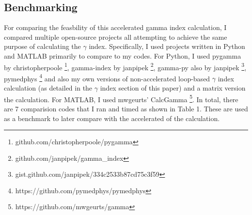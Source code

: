 \documentclass[12pt]{article}
\begin{document}
\subsection{Benchmarking}
For comparing the feasbility of this accelerated gamma index calculation, I compared multiple open-source projects all attempting to achieve the same purpose of calculating the $\gamma$ index. Specifically, I used projects written in Python and MATLAB primarily to compare to my codes. For Python, I used pygamma by christopherpoole \footnote[1]{github.com/christopherpoole/pygamma}, gamma-index by janpipek \footnote[2]{github.com/janpipek/gamma\_index}, gamma-py also by janpipek \footnote[3]{gist.github.com/janpipek/334c2533b87cd75c3f59}, pymedphys \footnote[5]{https://github.com/pymedphys/pymedphys} and also my own versions of non-accelerated loop-based $\gamma$ index calculation (as detailed in the $\gamma$ index section of this paper) and a matrix version the calculation. For MATLAB, I used mwgeurts' CalcGamma \footnote[5]{https://github.com/mwgeurts/gamma}. In total, there are 7 comparision codes that I ran and timed as shown in Table 1. These are used as a benchmark to later compare with the accelerated of the calculation.


\pagebreak
\printbibliography
\end{document}
